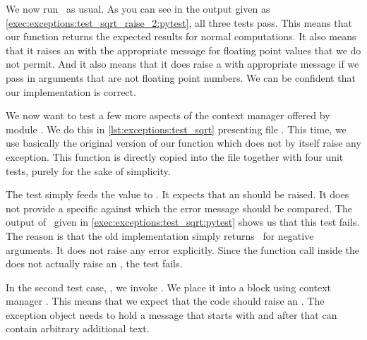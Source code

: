 %
We now run \pytest\ as usual.
As you can see in the output given as \cref{exec:exceptions:test_sqrt_raise_2:pytest}, all three tests pass.
This means that our  function returns the expected results for normal computations.
It also means that it raises an  with the appropriate message for floating point values that we do not permit.
And it also means that it does raise a  with appropriate message if we pass in arguments that are not floating point numbers.
We can be confident that our implementation is correct.

%
%
%
%
%
%
We now want to test a few more aspects of the  context manager offered by module .
We do this in \cref{lst:exceptions:test_sqrt} presenting file .
This time, we use basically the original version of our  function which does not by itself raise any exception.
This  function is directly copied into the file together with four unit tests, purely for the sake of simplicity.

The test  simply feeds the value  to .
It expects that an  should be raised.
It does not provide a specific   against which the error message should be compared.
The output of \pytest\ given in \cref{exec:exceptions:test_sqrt:pytest} shows us that this test fails.
The reason is that the old implementation  simply returns~ for negative arguments.
It does not raise any error explicitly.
Since the function call inside the  does not actually raise an , the test fails.

In the second test case, , we invoke .
We place it into a  block using context manager .
This means that we expect that the code should raise an .
The exception object needs to hold a message that starts with  and after that can contain arbitrary additional text.

